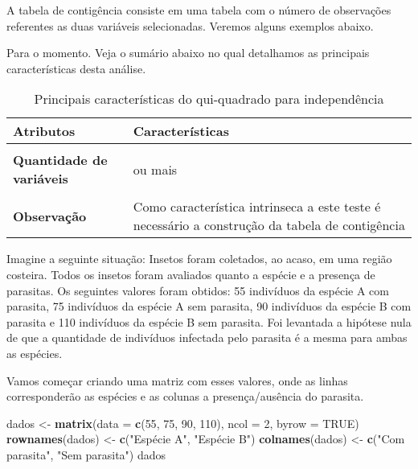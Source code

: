 \documentclass[titlepage, oneside, openany, a4paper]{book}
\newenvironment{Shaded}{\begin{snugshade}}{\end{snugshade}}
\newcommand{\DataTypeTok}[1]{\textcolor[rgb]{0.13,0.29,0.53}{#1}}
\newcommand{\DecValTok}[1]{\textcolor[rgb]{0.00,0.00,0.81}{#1}}
\newcommand{\KeywordTok}[1]{\textcolor[rgb]{0.13,0.29,0.53}{\textbf{#1}}}
\newcommand{\NormalTok}[1]{#1}
\newcommand{\OtherTok}[1]{\textcolor[rgb]{0.56,0.35,0.01}{#1}}
\newcommand{\StringTok}[1]{\textcolor[rgb]{0.31,0.60,0.02}{#1}}
\begin{document}
A tabela de contigência consiste em uma tabela com o número de observações referentes as duas variáveis selecionadas. Veremos alguns exemplos abaixo.

Para o momento. Veja o sumário abaixo no qual detalhamos as principais características desta análise.

\begin{table}

\caption{\label{tab:tab2qui}Principais características do qui-quadrado para independência}
\centering
\begin{tabular}[c]{>{\raggedright\arraybackslash}p{10em}>{\raggedright\arraybackslash}p{30em}}
\toprule
Atributos & Características\\
\midrule
\textbf{\cellcolor{gray!6}{Tipo de variável}} & \cellcolor{gray!6}{Categórica}\\
\textbf{Quantidade de variáveis} & 2 ou mais\\
\textbf{\cellcolor{gray!6}{Hipótese nula}} & \cellcolor{gray!6}{As proporções relativas de uma variável são independentes de uma segunda variável}\\
\textbf{Observação} & Como característica intrinseca a este teste é necessário a construção da tabela de contigência\\
\bottomrule
\end{tabular}
\end{table}

Imagine a seguinte situação: Insetos foram coletados, ao acaso, em uma região costeira. Todos os insetos foram avaliados quanto a espécie e a presença de parasitas. Os seguintes valores foram obtidos: 55 indivíduos da espécie A com parasita, 75 indivíduos da espécie A sem parasita, 90 indivíduos da espécie B com parasita e 110 indivíduos da espécie B sem parasita. Foi levantada a hipótese nula de que a quantidade de indivíduos infectada pelo parasita é a mesma para ambas as espécies.

Vamos começar criando uma matriz com esses valores, onde as linhas corresponderão as espécies e as colunas a presença/ausência do parasita.

\begin{Shaded}
\begin{Highlighting}[]
\NormalTok{dados <-}\StringTok{ }\KeywordTok{matrix}\NormalTok{(}\DataTypeTok{data =} \KeywordTok{c}\NormalTok{(}\DecValTok{55}\NormalTok{, }\DecValTok{75}\NormalTok{, }\DecValTok{90}\NormalTok{, }\DecValTok{110}\NormalTok{), }\DataTypeTok{ncol =} \DecValTok{2}\NormalTok{, }\DataTypeTok{byrow =} \OtherTok{TRUE}\NormalTok{)}
\KeywordTok{rownames}\NormalTok{(dados) <-}\StringTok{ }\KeywordTok{c}\NormalTok{(}\StringTok{"Espécie A"}\NormalTok{, }\StringTok{"Espécie B"}\NormalTok{)}
\KeywordTok{colnames}\NormalTok{(dados) <-}\StringTok{ }\KeywordTok{c}\NormalTok{(}\StringTok{"Com parasita"}\NormalTok{, }\StringTok{"Sem parasita"}\NormalTok{)}
\NormalTok{dados}
\end{Highlighting}
\end{Shaded}
\end{document}
